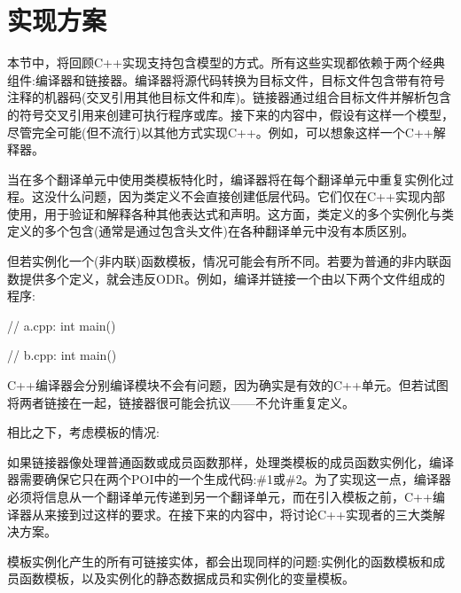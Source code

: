 \section{实现方案}

本节中，将回顾C++实现支持包含模型的方式。所有这些实现都依赖于两个经典组件:编译器和链接器。编译器将源代码转换为目标文件，目标文件包含带有符号注释的机器码(交叉引用其他目标文件和库)。链接器通过组合目标文件并解析包含的符号交叉引用来创建可执行程序或库。接下来的内容中，假设有这样一个模型，尽管完全可能(但不流行)以其他方式实现C++。例如，可以想象这样一个C++解释器。

当在多个翻译单元中使用类模板特化时，编译器将在每个翻译单元中重复实例化过程。这没什么问题，因为类定义不会直接创建低层代码。它们仅在C++实现内部使用，用于验证和解释各种其他表达式和声明。这方面，类定义的多个实例化与类定义的多个包含(通常是通过包含头文件)在各种翻译单元中没有本质区别。

但若实例化一个(非内联)函数模板，情况可能会有所不同。若要为普通的非内联函数提供多个定义，就会违反ODR。例如，编译并链接一个由以下两个文件组成的程序:

\begin{cpp}
// a.cpp:
int main()
{ }

// b.cpp:
int main()
{ }
\end{cpp}

C++编译器会分别编译模块不会有问题，因为确实是有效的C++单元。但若试图将两者链接在一起，链接器很可能会抗议——不允许重复定义。

相比之下，考虑模板的情况:


如果链接器像处理普通函数或成员函数那样，处理类模板的成员函数实例化，编译器需要确保它只在两个POI中的一个生成代码:\#1或\#2。为了实现这一点，编译器必须将信息从一个翻译单元传递到另一个翻译单元，而在引入模板之前，C++编译器从来接到过这样的要求。在接下来的内容中，将讨论C++实现者的三大类解决方案。

模板实例化产生的所有可链接实体，都会出现同样的问题:实例化的函数模板和成员函数模板，以及实例化的静态数据成员和实例化的变量模板。

